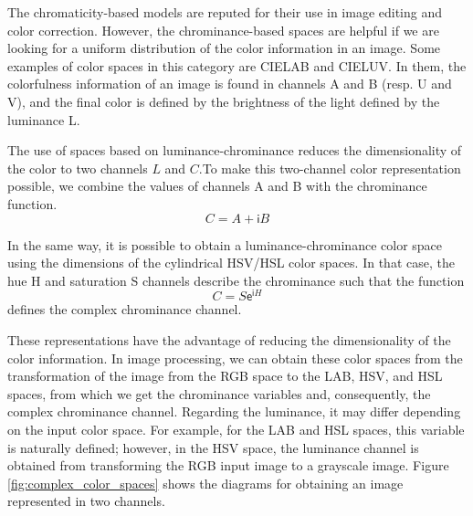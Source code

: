 The chromaticity-based models are reputed for their use in image editing and color correction. However, the chrominance-based spaces are helpful if we are looking for a uniform distribution of the color information in an image. Some examples of color spaces in this category are CIELAB and CIELUV. In them, the colorfulness information of an image is found in channels A and B (resp. U and V), and the final color is defined by the brightness of the light defined by the luminance L.

The use of spaces based on luminance-chrominance reduces the dimensionality of the color to two channels $L$ and $C$.To make this two-channel color representation possible, we combine the values of channels A and B with the chrominance function.
\begin{equation}\label{eq:chrominance_lab}
    C = A + \mathsf{i}B
\end{equation}

In the same way, it is possible to obtain a luminance-chrominance color space using the dimensions of the cylindrical HSV/HSL color spaces. In that case, the hue H and saturation S channels describe the chrominance such that the function
\begin{equation}\label{eq:chrominance_hsv}
    C = S \mathsf{e}^{\mathsf{i}H}
\end{equation}
defines the complex chrominance channel.

These representations have the advantage of reducing the dimensionality of the color information. In image processing, we can obtain these color spaces from the transformation of the image from the RGB space to the LAB, HSV, and HSL spaces, from which we get the chrominance variables and, consequently, the complex chrominance channel. Regarding the luminance, it may differ depending on the input color space. For example, for the LAB and HSL spaces, this variable is naturally defined; however, in the HSV space, the luminance channel is obtained from transforming the RGB input image to a grayscale image. Figure \ref{fig:complex_color_spaces} shows the diagrams for obtaining an image represented in two channels.

